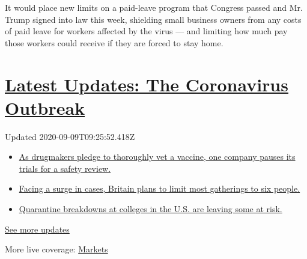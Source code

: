 It would place new limits on a paid-leave program that Congress passed
and Mr. Trump signed into law this week, shielding small business owners
from any costs of paid leave for workers affected by the virus --- and
limiting how much pay those workers could receive if they are forced to
stay home.

\hypertarget{latest-updates-the-coronavirus-outbreak}{%
\section{\texorpdfstring{\href{https://www.nytimes3xbfgragh.onion/2020/09/09/world/covid-19-coronavirus.html?action=click\&pgtype=Article\&state=default\&region=MAIN_CONTENT_1\&context=storylines_live_updates}{Latest
Updates: The Coronavirus
Outbreak}}{Latest Updates: The Coronavirus Outbreak}}\label{latest-updates-the-coronavirus-outbreak}}

Updated 2020-09-09T09:25:52.418Z

\begin{itemize}
\tightlist
\item
  \href{https://www.nytimes3xbfgragh.onion/2020/09/09/world/covid-19-coronavirus.html?action=click\&pgtype=Article\&state=default\&region=MAIN_CONTENT_1\&context=storylines_live_updates\#link-70cea8bb}{As
  drugmakers pledge to thoroughly vet a vaccine, one company pauses its
  trials for a safety review.}
\item
  \href{https://www.nytimes3xbfgragh.onion/2020/09/09/world/covid-19-coronavirus.html?action=click\&pgtype=Article\&state=default\&region=MAIN_CONTENT_1\&context=storylines_live_updates\#link-4438dd7}{Facing
  a surge in cases, Britain plans to limit most gatherings to six
  people.}
\item
  \href{https://www.nytimes3xbfgragh.onion/2020/09/09/world/covid-19-coronavirus.html?action=click\&pgtype=Article\&state=default\&region=MAIN_CONTENT_1\&context=storylines_live_updates\#link-11cec4c0}{Quarantine
  breakdowns at colleges in the U.S. are leaving some at risk.}
\end{itemize}

\href{https://www.nytimes3xbfgragh.onion/2020/09/09/world/covid-19-coronavirus.html?action=click\&pgtype=Article\&state=default\&region=MAIN_CONTENT_1\&context=storylines_live_updates}{See
more updates}

More live coverage:
\href{https://www.nytimes3xbfgragh.onion/live/2020/09/08/business/stock-market-today-coronavirus?action=click\&pgtype=Article\&state=default\&region=MAIN_CONTENT_1\&context=storylines_live_updates}{Markets}

